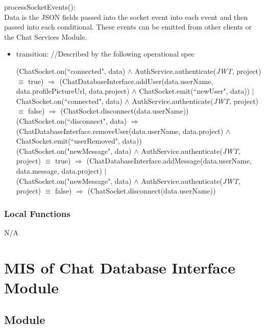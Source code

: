 \documentclass[12pt, titlepage]{article}
\begin{document}
	\noindent processSocketEvents():\\
	
	\noindent Data is the JSON fields passed into the socket event into each event and then passed into each conditional. These events can be emitted from other clients or the Chat Services Module.
	
	\begin{itemize}
		
		\item transition: //Described by the following operational spec
		
		(ChatSocket.on(``connected", data) $\land$ AuthService.authenticate(\textit{JWT}, project) $\equiv$ true) $\Rightarrow$ (ChatDatabaseInterface.addUser(data.userName, data.profilePictureUrl, data.project) $\land$ ChatSocket.emit(``newUser", data)) $|$\\
		ChatSocket.on(``connected", data) $\land$ AuthService.authenticate(\textit{JWT}, project) $\equiv$ false) $\Rightarrow$ (ChatSocket.disconnect(data.userName))\\
		
		(ChatSocket.on(``disconnect", data) $\Rightarrow$ (ChatDatabaseInterface.removeUser(data.userName, data.project) $\land$ ChatSocket.emit(``userRemoved", data))\\
		
		(ChatSocket.on("newMessage", data) $\land$ AuthService.authenticate(\textit{JWT}, project) $\equiv$ true) $\Rightarrow$ (ChatDatabaseInterface.addMessage(data.userName, data.message, data.project) $|$\\
		(ChatSocket.on("newMessage", data) $\land$ AuthService.authenticate(\textit{JWT}, project) $\equiv$ false) $\Rightarrow$ (ChatSocket.disconnect(data.userName))
		
	\end{itemize}
	
	\subsubsection{Local Functions}
	
	N/A
	
	\newpage
	
	\section{MIS of Chat Database Interface Module} \label{Module}
	
	\subsection{Module}
	
\end{document}
